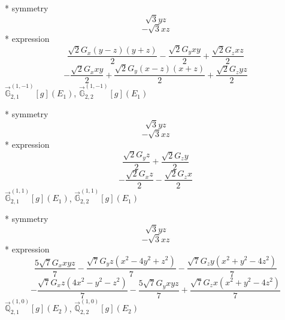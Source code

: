 \documentclass[fleqn,8pt]{jsarticle}
\begin{document}
\noindent\quad ** symmetry
\begin{dmath*}
\sqrt{3} y z
\end{dmath*}
\begin{dmath*}
- \sqrt{3} x z
\end{dmath*}
\noindent\quad ** expression
\begin{dmath*}
\frac{\sqrt{2} G_{x} \left(y - z\right) \left(y + z\right)}{2} - \frac{\sqrt{2} G_{y} x y}{2} + \frac{\sqrt{2} G_{z} x z}{2}
\end{dmath*}
\begin{dmath*}
- \frac{\sqrt{2} G_{x} x y}{2} + \frac{\sqrt{2} G_{y} \left(x - z\right) \left(x + z\right)}{2} + \frac{\sqrt{2} G_{z} y z}{2}
\end{dmath*}
\noindent\quad $\vec{\mathbb{G}}_{2,1}^{(1,-1)}[g](E_{1})$, $\vec{\mathbb{G}}_{2,2}^{(1,-1)}[g](E_{1})$

\noindent\quad ** symmetry
\begin{dmath*}
\sqrt{3} y z
\end{dmath*}
\begin{dmath*}
- \sqrt{3} x z
\end{dmath*}
\noindent\quad ** expression
\begin{dmath*}
\frac{\sqrt{2} G_{y} z}{2} + \frac{\sqrt{2} G_{z} y}{2}
\end{dmath*}
\begin{dmath*}
- \frac{\sqrt{2} G_{x} z}{2} - \frac{\sqrt{2} G_{z} x}{2}
\end{dmath*}
\noindent\quad $\vec{\mathbb{G}}_{2,1}^{(1,1)}[g](E_{1})$, $\vec{\mathbb{G}}_{2,2}^{(1,1)}[g](E_{1})$

\noindent\quad ** symmetry
\begin{dmath*}
\sqrt{3} y z
\end{dmath*}
\begin{dmath*}
- \sqrt{3} x z
\end{dmath*}
\noindent\quad ** expression
\begin{dmath*}
\frac{5 \sqrt{7} G_{x} x y z}{7} - \frac{\sqrt{7} G_{y} z \left(x^{2} - 4 y^{2} + z^{2}\right)}{7} - \frac{\sqrt{7} G_{z} y \left(x^{2} + y^{2} - 4 z^{2}\right)}{7}
\end{dmath*}
\begin{dmath*}
- \frac{\sqrt{7} G_{x} z \left(4 x^{2} - y^{2} - z^{2}\right)}{7} - \frac{5 \sqrt{7} G_{y} x y z}{7} + \frac{\sqrt{7} G_{z} x \left(x^{2} + y^{2} - 4 z^{2}\right)}{7}
\end{dmath*}
\noindent\quad $\vec{\mathbb{Q}}_{2,1}^{(1,0)}[g](E_{2})$, $\vec{\mathbb{Q}}_{2,2}^{(1,0)}[g](E_{2})$
\end{document}
